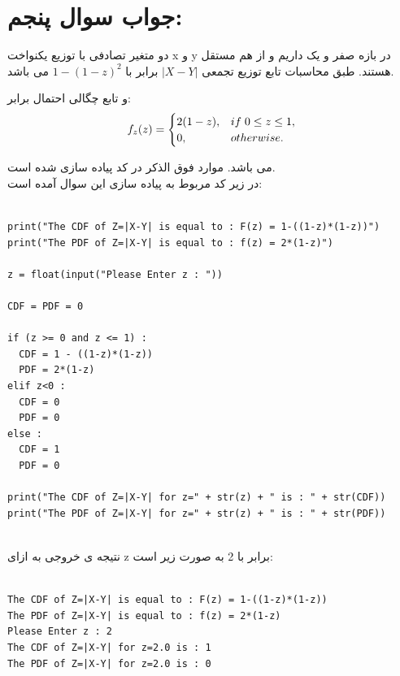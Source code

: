 \documentclass[a4paper,14pt]{article}
\begin{document}
\section*{جواب سوال پنجم:}	
دو متغیر تصادفی با توزیع یکنواخت x و y در بازه صفر و یک داریم و از هم مستقل هستند.
طبق محاسبات تابع توزیع تجمعی 
$|X-Y|$
برابر با
$1 - (1 - z)^2$
می باشد.

و  تابع چگالی احتمال برابر:
$$
f_z(z) =
\begin{cases}
	2(1 - z), & if \hspace{1mm} 0 \leq z \leq 1	, \\
	0, & otherwise.
\end{cases}
$$	

می باشد. موارد فوق الذکر در کد پیاده سازی شده است.\\

در زیر کد مربوط به پیاده سازی این سوال آمده است:\\

\fontsize{12}{12}\selectfont
\begin{latin}
	\begin{lstlisting}
		
print("The CDF of Z=|X-Y| is equal to : F(z) = 1-((1-z)*(1-z))")
print("The PDF of Z=|X-Y| is equal to : f(z) = 2*(1-z)")

z = float(input("Please Enter z : "))

CDF = PDF = 0

if (z >= 0 and z <= 1) :
  CDF = 1 - ((1-z)*(1-z))
  PDF = 2*(1-z)
elif z<0 :
  CDF = 0
  PDF = 0
else :
  CDF = 1
  PDF = 0

print("The CDF of Z=|X-Y| for z=" + str(z) + " is : " + str(CDF))
print("The PDF of Z=|X-Y| for z=" + str(z) + " is : " + str(PDF))
		
	\end{lstlisting}
\end{latin}
\fontsize{14}{14}\selectfont

نتیجه ی  خروجی به ازای z برابر با 2 به صورت زیر است:\\

\fontsize{12}{12}\selectfont
\begin{latin}
	\begin{lstlisting}
		
The CDF of Z=|X-Y| is equal to : F(z) = 1-((1-z)*(1-z))
The PDF of Z=|X-Y| is equal to : f(z) = 2*(1-z)
Please Enter z : 2
The CDF of Z=|X-Y| for z=2.0 is : 1
The PDF of Z=|X-Y| for z=2.0 is : 0
		
	\end{lstlisting}
\end{latin}
\fontsize{14}{14}\selectfont
\end{document}
